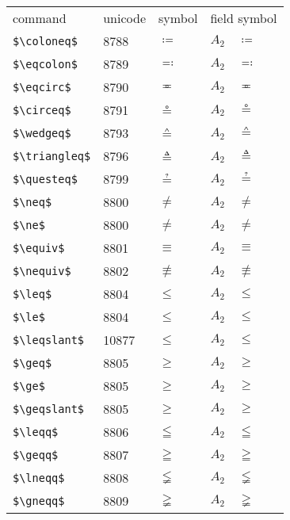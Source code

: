 \documentclass{article}
\begin{document}
\begin{table}
\begin{center}
\begin{tabular}{llll}
 command               & unicode & symbol         & field symbol\\
 \verb#$\coloneq$#     & 8788    & $\coloneq$     & $A_2\quad \coloneq$\\
 \verb#$\eqcolon$#     & 8789    & $\eqcolon$     & $A_2\quad \eqcolon$\\
 \verb#$\eqcirc$#      & 8790    & $\eqcirc$      & $A_2\quad \eqcirc$\\
 \verb#$\circeq$#      & 8791    & $\circeq$      & $A_2\quad \circeq$\\
 \verb#$\wedgeq$#      & 8793    & $\wedgeq$      & $A_2\quad \wedgeq$\\
 \verb#$\triangleq$#   & 8796    & $\triangleq$   & $A_2\quad \triangleq$\\
 \verb#$\questeq$#     & 8799    & $\questeq$     & $A_2\quad \questeq$\\
 \verb#$\neq$#         & 8800    & $\neq$         & $A_2\quad \neq$\\
 \verb#$\ne$#          & 8800    & $\ne$          & $A_2\quad \ne$\\
 \verb#$\equiv$#       & 8801    & $\equiv$       & $A_2\quad \equiv$\\
 \verb#$\nequiv$#      & 8802    & $\nequiv$      & $A_2\quad \nequiv$\\
 \verb#$\leq$#         & 8804    & $\leq$         & $A_2\quad \leq$\\
 \verb#$\le$#          & 8804    & $\le$          & $A_2\quad \le$\\
 \verb#$\leqslant$#    & 10877   & $\leqslant$    & $A_2\quad \leqslant$\\
 \verb#$\geq$#         & 8805    & $\geq$         & $A_2\quad \geq$\\
 \verb#$\ge$#          & 8805    & $\ge$          & $A_2\quad \ge$\\
 \verb#$\geqslant$#    & 8805    & $\geqslant$    & $A_2\quad \geqslant$\\
 \verb#$\leqq$#        & 8806    & $\leqq$        & $A_2\quad \leqq$\\
 \verb#$\geqq$#        & 8807    & $\geqq$        & $A_2\quad \geqq$\\
 \verb#$\lneqq$#       & 8808    & $\lneqq$       & $A_2\quad \lneqq$\\
 \verb#$\gneqq$#       & 8809    & $\gneqq$       & $A_2\quad \gneqq$\\

\end{tabular}
\end{center}
\end{table}
\end{document}
